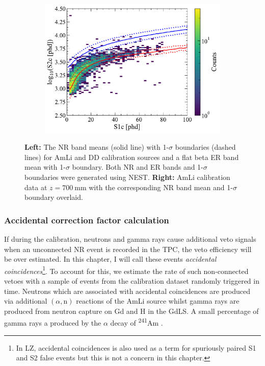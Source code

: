 \begin{enumerate}
\begin{figure}[!ht]
\begin{subfigure}[b]{0.49\textwidth}
        \includegraphics[width=\textwidth]{figures/VetoEfficiency/AmLi700_NRBands.pdf}
        \caption{}
        \label{fig:VetoEff/AmLi700_NRBands}
    \end{subfigure}
    \caption[NR and ER bands for the flat beta ER, AmLi NR and DD NR models alongside a plot of AmLi calibration data with the corresponding NR bands overlaid.]{\textbf{Left:} The NR band means (solid line) with 1-$\sigma$ boundaries (dashed lines) for AmLi and DD calibration sources and a flat beta ER band mean with 1-$\sigma$ boundary. Both NR and ER bands and 1-$\sigma$ boundaries were generated using NEST. \textbf{Right:} AmLi calibration data at $z=700~\text{mm}$ with the corresponding NR band mean and 1-$\sigma$ boundary overlaid.}
    \label{fig:VetoEff/SR3NRBands&AmLi700mmData}
\end{figure}
\end{enumerate}

\subsubsection{Accidental correction factor calculation}\label{sec:VetoEff/AmLiAccCorrection}
If during the calibration, neutrons and gamma rays cause additional veto signals when an unconnected NR event is recorded in the TPC, the veto efficiency will be over estimated. In this chapter, I will call these events \textit{accidental coincidences}\footnote{In LZ, accidental coincidences is also used as a term for spuriously paired S1 and S2 false events but this is not a concern in this chapter.}. To account for this, we estimate the rate of such non-connected vetoes with a sample of events from the calibration dataset randomly triggered in time. Neutrons which are associated with accidental coincidences are produced via additional $(\alpha,\text{n})$ reactions of the AmLi source whilst gamma rays are produced from neutron capture on Gd and H in the GdLS. A small percentage of gamma rays a produced by the $\alpha$ decay of \textsuperscript{241}Am \cite{Sazzad:2023uqs}.

